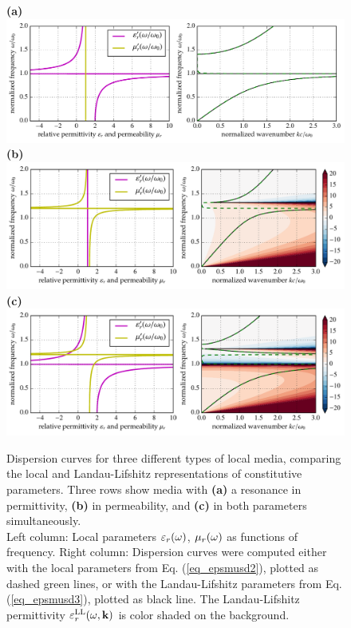 \begin{figure}[t] \caption{Dispersion curves for three different types of local media, comparing the local and Landau-Lifshitz representations of constitutive parameters. Three rows show media with \textbf{(a)} a  resonance in permittivity, \textbf{(b)} in permeability, and \textbf{(c)} in both parameters simultaneously.\\
Left column: Local parameters $\varepsilon_r(\omega)$, $\mu_r(\omega)$ as functions of frequency. Right column: Dispersion curves were computed either with the local parameters from Eq. (\ref{eq_epsmusd2}), plotted as dashed green lines, or with the Landau-Lifshitz parameters from Eq. (\ref{eq_epsmusd3}), plotted as black line. The Landau-Lifshitz permittivity $\varepsilon_r^\text{LL}(\omega,{\mathbf{k}})$ is color shaded on the background. %
} \label{fg_dcll} \centering  
\textbf{(a)}\\\includegraphics[width=1\textwidth]{img/dispersion_landau_lifshitz/dispersion_ll_el.pdf}    
\textbf{(b)}\\\includegraphics[width=1\textwidth]{img/dispersion_landau_lifshitz/dispersion_ll_mag.pdf}
\textbf{(c)}\\\includegraphics[width=1\textwidth]{img/dispersion_landau_lifshitz/dispersion_ll_elmag.pdf}
\end{figure}
\clearpage

